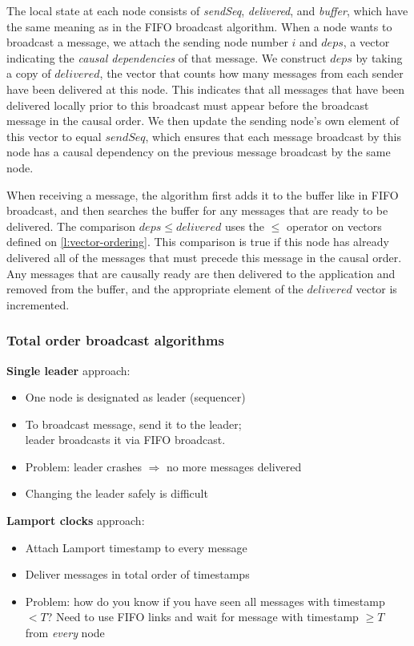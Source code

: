 
The local state at each node consists of \emph{sendSeq}, \emph{delivered}, and \emph{buffer}, which have the same meaning as in the FIFO broadcast algorithm.
When a node wants to broadcast a message, we attach the sending node number $i$ and $\mathit{deps}$, a vector indicating the \emph{causal dependencies} of that message.
We construct $\mathit{deps}$ by taking a copy of $\mathit{delivered}$, the vector that counts how many messages from each sender have been delivered at this node.
This indicates that all messages that have been delivered locally prior to this broadcast must appear before the broadcast message in the causal order.
We then update the sending node's own element of this vector to equal $\mathit{sendSeq}$, which ensures that each message broadcast by this node has a causal dependency on the previous message broadcast by the same node.

When receiving a message, the algorithm first adds it to the buffer like in FIFO broadcast, and then searches the buffer for any messages that are ready to be delivered.
The comparison $\mathit{deps} \le \mathit{delivered}$ uses the $\le$ operator on vectors defined on \autoref{l:vector-ordering}.
This comparison is true if this node has already delivered all of the messages that must precede this message in the causal order.
Any messages that are causally ready are then delivered to the application and removed from the buffer, and the appropriate element of the $\mathit{delivered}$ vector is incremented.

\begin{frame}
    \label{s:total-bcast-alg}
    \frametitle{Total order broadcast algorithms}
    \textbf{Single leader} approach:
    \begin{itemize}
        \item One node is designated as leader (sequencer)
        \item To broadcast message, send it to the leader;\\ leader broadcasts it via FIFO broadcast.\pause
        \item Problem: leader crashes $\Longrightarrow$ no more messages delivered
        \item Changing the leader safely is difficult\\[1em]
    \end{itemize}\pause
    \textbf{Lamport clocks} approach:
    \begin{itemize}
        \item Attach Lamport timestamp to every message
        \item Deliver messages in total order of timestamps\pause
        \item Problem: how do you know if you have seen all messages with timestamp $< T$?
            Need to use FIFO links and wait for message with timestamp $\ge T$ from \emph{every} node
    \end{itemize}
\end{frame}
\label{l:total-bcast-alg}

